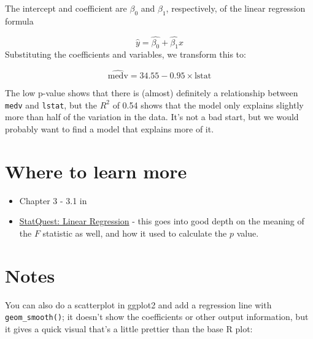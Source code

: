 \documentclass[
]{book}
\providecommand{\tightlist}{%
  \setlength{\itemsep}{0pt}\setlength{\parskip}{0pt}}
\begin{document}
The intercept and coefficient are \(\beta_0\) and \(\beta_1\), respectively, of the linear regression formula

\[\hat{y} = \hat{\beta_0} + \hat{\beta_1}x\]
Substituting the coefficients and variables, we transform this to:

\[\widehat{\text{medv}} = 34.55 - 0.95 \times \text{lstat}\]

The low p-value shows that there is (almost) definitely a relationship between \texttt{medv} and \texttt{lstat}, but the \(R^2\) of 0.54 shows that the model only explains slightly more than half of the variation in the data. It's not a bad start, but we would probably want to find a model that explains more of it.

\hypertarget{where-to-learn-more}{%
\section{Where to learn more}\label{where-to-learn-more}}

\begin{itemize}
\tightlist
\item
  Chapter 3 - 3.1 in \citet{ISLR}
\item
  \href{https://www.youtube.com/watch?v=nk2CQITm_eo}{StatQuest: Linear Regression} - this goes into good depth on the meaning of the \(F\) statistic as well, and how it used to calculate the \(p\) value.
\end{itemize}

\hypertarget{notes}{%
\section{Notes}\label{notes}}

You can also do a scatterplot in ggplot2 and add a regression line with \texttt{geom\_smooth()}; it doesn't show the coefficients or other output information, but it gives a quick visual that's a little prettier than the base R plot:
\end{document}
